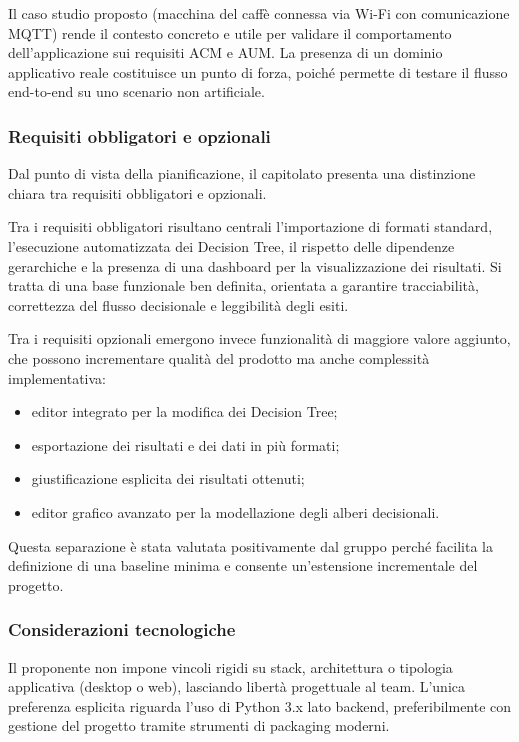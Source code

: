 \documentclass[a4paper,12pt]{article}
\begin{document}
Il caso studio proposto (macchina del caffè connessa via Wi-Fi con comunicazione MQTT) rende il contesto concreto e utile per validare il comportamento dell'applicazione sui requisiti ACM e AUM. La presenza di un dominio applicativo reale costituisce un punto di forza, poiché permette di testare il flusso end-to-end su uno scenario non artificiale.

\subsubsection{Requisiti obbligatori e opzionali}

Dal punto di vista della pianificazione, il capitolato presenta una distinzione chiara tra requisiti obbligatori e opzionali.

Tra i requisiti obbligatori risultano centrali l'importazione di formati standard, l'esecuzione automatizzata dei Decision Tree, il rispetto delle dipendenze gerarchiche e la presenza di una dashboard per la visualizzazione dei risultati. Si tratta di una base funzionale ben definita, orientata a garantire tracciabilità, correttezza del flusso decisionale e leggibilità degli esiti.

Tra i requisiti opzionali emergono invece funzionalità di maggiore valore aggiunto, che possono incrementare qualità del prodotto ma anche complessità implementativa:

\begin{itemize}
    \item editor integrato per la modifica dei Decision Tree;
    \item esportazione dei risultati e dei dati in più formati;
    \item giustificazione esplicita dei risultati ottenuti;
    \item editor grafico avanzato per la modellazione degli alberi decisionali.
\end{itemize}

Questa separazione è stata valutata positivamente dal gruppo perché facilita la definizione di una baseline minima e consente un'estensione incrementale del progetto.

\subsubsection{Considerazioni tecnologiche}

Il proponente non impone vincoli rigidi su stack, architettura o tipologia applicativa (desktop o web), lasciando libertà progettuale al team. L'unica preferenza esplicita riguarda l'uso di Python 3.x lato backend, preferibilmente con gestione del progetto tramite strumenti di packaging moderni.
\end{document}
